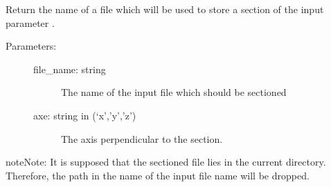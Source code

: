 \documentclass[letterpaper,10pt,english]{sphinxmanual}
\begin{document}

\begin{fulllineitems}
\label{\detokenize{appendices:s2Dcd.s2Dcd.file_name_sec}}
Return the name of a file which will be used to store a section
of the input parameter .
\begin{description}
\item[{Parameters:}] \leavevmode\begin{description}
\item[{file\_name: string}] \leavevmode
The name of the input file which should be sectioned

\item[{axe: string in (‘x’,’y’,’z’)}] \leavevmode
The axis perpendicular to the section.

\end{description}

\end{description}

\begin{sphinxadmonition}{note}{Note:}
It is supposed that the sectioned file lies in the current 
directory. Therefore, the path in the name of the input
file name will be dropped.
\end{sphinxadmonition}

\end{fulllineitems}

\end{document}
